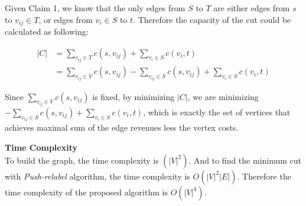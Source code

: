 \documentclass{article}
\newcommand{\Complexity}{\vspace{0.3cm} \noindent\textbf{Time Complexity} \vspace{0.2cm} \\}
\begin{document}
Given Claim 1, we know that the only edges from $S$ to $T$ are either edges from $s$ to $v_{ij} \in
T$, or edges from $v_i \in S$ to $t$. Therefore the capacity of the cut could be calculated as
following:

\begin{align}
  |C| & = \sum_{v_{ij} \in T} c(s, v_{ij}) + \sum_{v_i \in S} c(v_i, t) \\
  & = \sum_{v_{ij} \in V} c(s, v_{ij}) - \sum_{v_{ij} \in S} c(s, v_{ij}) + \sum_{v_i \in S} c(v_i,
  t) 
\end{align}

Since $\sum_{v_{ij} \in V} c(s, v_{ij})$ is fixed, by minimizing $|C|$, we are minimizing 
$-\sum_{v_{ij} \in S} c(s, v_{ij}) + \sum_{v_i \in S} c(v_i,t)$, which is exactly the set of
vertices that achieves maximal sum of the edge
revenues less the vertex costs.
  
\Complexity
To build the graph, the time complexity is $(|V|^2)$. And to find the minimum cut with
\textit{Push-relabel} algorithm, the time complexity is $O(|V|^2|E|)$. Therefore the time complexity
of the proposed algorithm is $O(|V|^4)$.
\end{document}
